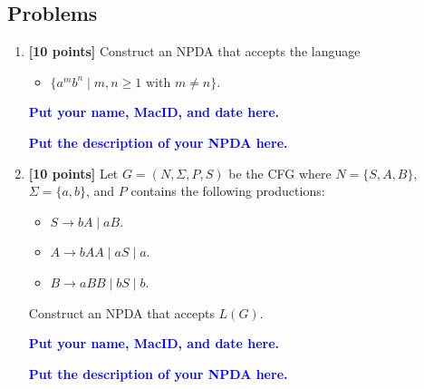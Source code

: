 \documentclass[11pt,fleqn]{article}
\newcommand{\be}{\begin{enumerate}}
\newcommand{\ee}{\end{enumerate}}
\newcommand{\set}[1]{{\{ #1 \}}}
\begin{document}
\newpage

\subsection*{Problems}

\be

  \item \textbf{[10 points]} Construct an NPDA that accepts the language

  \begin{itemize}

    \item[] $\set{a^mb^n \mid m,n \ge 1 \mbox{ with } m \not= n}$.

  \end{itemize}

  \bigskip

  \textcolor{blue}{\textbf{Put your name, MacID, and date here.}}

  \textcolor{blue}{\textbf{Put the description of your NPDA here.}}

  \item \textbf{[10 points]} Let $G = (N,\Sigma,P,S)$ be the CFG
    where $N = \set{S,A,B}$, $\Sigma = \set{a,b}$, and $P$ contains the
    following productions:

  \begin{itemize}

    \item[] $S \rightarrow bA \mid aB$.

    \item[] $A \rightarrow bAA \mid aS \mid a$.

    \item[] $B \rightarrow aBB \mid bS  \mid b$.

  \end{itemize}

  Construct an NPDA that accepts $L(G)$.
  \bigskip

  \textcolor{blue}{\textbf{Put your name, MacID, and date here.}}

  \textcolor{blue}{\textbf{Put the description of your NPDA here.}}

\ee
\end{document}
